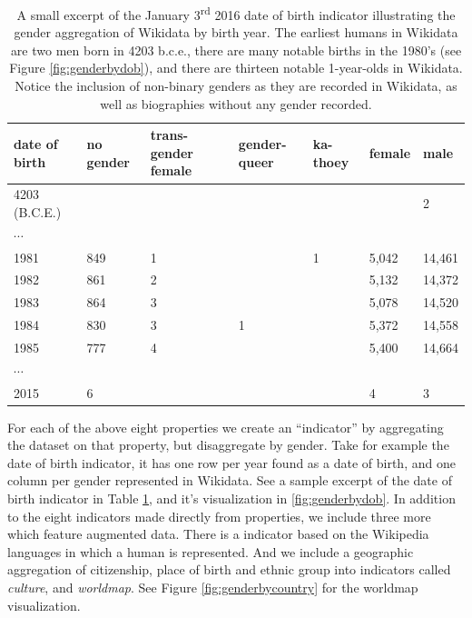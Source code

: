 \documentclass{sig-alternate-05-2015}
\begin{document}
\begin{table}
\caption{A small excerpt of the January 3\textsuperscript{rd} 2016 date of birth indicator illustrating the gender aggregation of Wikidata by birth year. The earliest humans in Wikidata are two men born in 4203 b.c.e., there are many notable births in the 1980's (see Figure \ref{fig:genderbydob}), and there are thirteen notable 1-year-olds in Wikidata. Notice the inclusion of non-binary genders as they are recorded in Wikidata, as well as biographies without any gender recorded.}
\begin{tabular} {p{0.8cm}p{0.8cm}p{0.8cm}p{0.8cm}p{0.8cm}p{0.8cm}p{0.8cm}}
\toprule
date of birth & no gender & trans-gender female & gender-queer & ka-thoey & female & male \\
\midrule
4203 \small{(B.C.E.)} & & & & & & 2   \\ 
$\cdots$ &  &  &  & &  &    \\ 
1981 & 849 & 1 &  & 1 &5,042 & 14,461 \\ 
1982 & 861 & 2 &  & &5,132 & 14,372  \\ 
1983 & 864 & 3 &  & &5,078 & 14,520  \\ 
1984 & 830 & 3 & 1 & &5,372 & 14,558   \\ 
1985 & 777 & 4 &  & &5,400 & 14,664  \\ 
$\cdots$ &  &  &  & &  &    \\ 
2015 & 6 &  &  & & 4 & 3  \\ 
\bottomrule
\end{tabular}
\label{table:dob}
\end{table}
For each of the above eight properties we create an ``indicator'' by aggregating the dataset on that property, but disaggregate by gender. Take for example the date of birth indicator, it has one row per year found as a date of birth, and one column per gender represented in Wikidata. See a sample excerpt of the date of birth indicator in Table \ref{table:dob}, and it's visualization in \ref{fig:genderbydob}. In addition to the eight indicators made directly from properties, we include three more which feature augmented data. There is a indicator based on the Wikipedia languages in which a human is represented. And we include a geographic aggregation of citizenship, place of birth and ethnic group into indicators called \textit{culture}, and \textit{worldmap}. See Figure \ref{fig:genderbycountry} for the worldmap visualization. 
\end{document}
